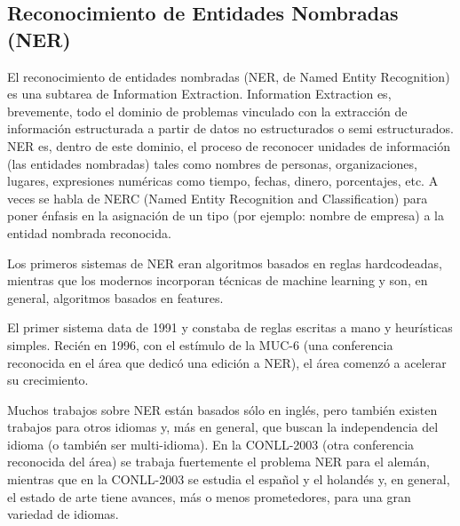 \subsection{Reconocimiento de Entidades Nombradas (NER)}
\label{subsec:nerc}

El reconocimiento de entidades nombradas (NER, de Named Entity
Recognition) es una subtarea de Information Extraction. Information
Extraction es, brevemente, todo el dominio de problemas vinculado con
la extracción de información estructurada a partir de datos no
estructurados o semi estructurados. NER es, dentro de este dominio, el
proceso de reconocer unidades de información (las entidades
nombradas) tales como nombres de personas, organizaciones, lugares,
expresiones numéricas como tiempo, fechas, dinero, porcentajes, etc.
A veces se habla de NERC (Named Entity Recognition and Classification)
para poner énfasis en la asignación de un tipo (por ejemplo: nombre
de empresa) a la entidad nombrada reconocida.

Los primeros sistemas de NER eran algoritmos basados en reglas
hardcodeadas, mientras que los modernos incorporan técnicas de
machine learning y son, en general, algoritmos basados en features.

El primer sistema data de 1991 y constaba de reglas escritas a mano y
heurísticas simples. Recién en 1996, con el estímulo de la MUC-6
(una conferencia reconocida en el área que dedicó una edición a
NER), el área comenzó a acelerar su crecimiento.

Muchos trabajos sobre NER están basados sólo en inglés, pero también existen trabajos para otros idiomas y, más en general, que buscan la independencia del idioma (o también ser multi-idioma). En la CONLL-2003 (otra conferencia reconocida del área) se trabaja fuertemente el problema NER para el alemán, mientras que en la CONLL-2003 se estudia el español y el holandés y, en general, el estado de arte tiene avances, más o menos prometedores, para una gran variedad de idiomas.

